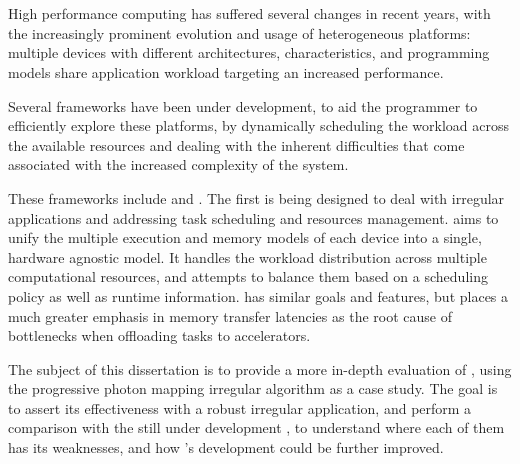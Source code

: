 \documentclass[main.tex]{subfiles}
\begin{document}
\cleardoublepage
{}
{}
\chapter*{\abstractname}

High performance computing has suffered several changes in recent years, with the increasingly prominent evolution and usage of heterogeneous platforms: multiple devices with different architectures, characteristics, and programming models share application workload targeting an increased performance.

Several frameworks have been under development, to aid the programmer to efficiently explore these platforms, by dynamically scheduling the workload across the available resources and dealing with the inherent difficulties that come associated with the increased complexity of the system.

These frameworks include \gama and \starpu. The first is being designed to deal with irregular applications and addressing task scheduling and resources management. \gama aims to unify the multiple execution and memory models of each device into a single, hardware agnostic model. It handles the workload distribution across multiple computational resources, and attempts to balance them based on a scheduling policy as well as runtime information. \starpu has similar goals and features, but places a much greater emphasis in memory transfer latencies as the root cause of bottlenecks when offloading tasks to accelerators.

The subject of this dissertation is to provide a more in-depth evaluation of \starpu, using the progressive photon mapping irregular algorithm as a case study. The goal is to assert its effectiveness with a robust irregular application, and perform a comparison with the still under development \gama, to understand where each of them has its weaknesses, and how \gama's development could be further improved.
\end{document}
